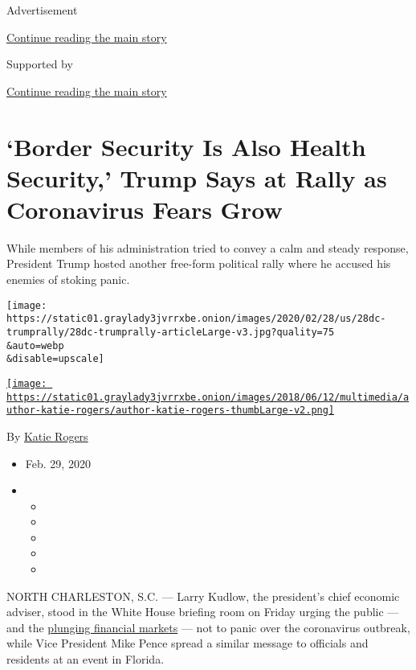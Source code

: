 Advertisement

\protect\hyperlink{after-top}{Continue reading the main story}

Supported by

\protect\hyperlink{after-sponsor}{Continue reading the main story}

\hypertarget{border-security-is-also-health-security-trump-says-at-rally-as-coronavirus-fears-grow}{%
\section{`Border Security Is Also Health Security,' Trump Says at Rally
as Coronavirus Fears
Grow}\label{border-security-is-also-health-security-trump-says-at-rally-as-coronavirus-fears-grow}}

While members of his administration tried to convey a calm and steady
response, President Trump hosted another free-form political rally where
he accused his enemies of stoking panic.

\texttt{[image: https://static01.graylady3jvrrxbe.onion/images/2020/02/28/us/28dc-trumprally/28dc-trumprally-articleLarge-v3.jpg?quality=75\\\&auto=webp\\\&disable=upscale]}

\href{https://www.nytimes3xbfgragh.onion/by/katie-rogers}{\texttt{[image: https://static01.graylady3jvrrxbe.onion/images/2018/06/12/multimedia/author-katie-rogers/author-katie-rogers-thumbLarge-v2.png]}}

By \href{https://www.nytimes3xbfgragh.onion/by/katie-rogers}{Katie
Rogers}

\begin{itemize}
\item
  Feb. 29, 2020
\item
  \begin{itemize}
  \item
  \item
  \item
  \item
  \item
  \end{itemize}
\end{itemize}

NORTH CHARLESTON, S.C. --- Larry Kudlow, the president's chief economic
adviser, stood in the White House briefing room on Friday urging the
public --- and the
\href{https://www.nytimes3xbfgragh.onion/2020/02/28/business/stock-market-today-coronavirus.html}{plunging
financial markets} --- not to panic over the coronavirus outbreak, while
Vice President Mike Pence spread a similar message to officials and
residents at an event in Florida.

